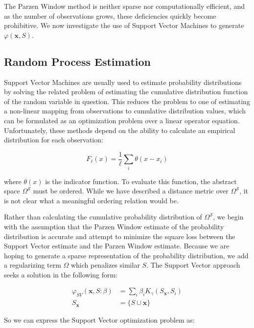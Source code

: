 \documentclass[10pt]{article}
\begin{document}
The Parzen Window method is neither sparse nor computationally efficient, and as the number of observations grows, these deficiencies quickly become prohibitive.  We now investigate the use of Support Vector Machines to generate \( \varphi(\mathbf{x}, S) \).

\subsection{ Random Process Estimation }
Support Vector Machines are usually used to estimate probability distributions by solving the related problem of estimating the cumulative distribution function of the random variable in question.  This reduces the problem to one of estimating a non-linear mapping from observations to cumulative distribution values, which can be formulated as an optimization problem over a linear operator equation.  Unfortunately, these methods depend on the ability to calculate an empirical distribution for each observation:

\begin{equation} F_\ell(x) = \frac{1}{\ell} \sum_i \theta(x-x_i) \end{equation}

where \( \theta(x) \) is the indicator function.  To evaluate this function, the abstract space \( \Omega^\mathcal{S} \) must be ordered.  While we have described a distance metric over \( \Omega^\mathcal{S} \), it is not clear what a meaningful ordering relation would be.

Rather than calculating the cumulative probability distribution of \( \Omega^\mathcal{S} \), we begin with the assumption that the Parzen Window estimate of the probability distribution is accurate and attempt to minimize the square loss between the Support Vector estimate and the Parzen Window estimate.  Because we are hoping to generate a sparse representation of the probability distribution, we add a regularizing term \( \Omega \) which penalizes similar \( S \).  The Support Vector approach seeks a solution in the following form:

\begin{align} \label{eq:SVResultSingle}
\varphi_{SV}( \mathbf{x}, S : \beta) &= \sum_{i} \beta_i K_\gamma( S_\mathbf{x}, S_i ) \\
S_\mathbf{x} &= \{ S \cup \mathbf{x} \} \nonumber
\end{align}

So we can express the Support Vector optimization problem as:
\end{document}
